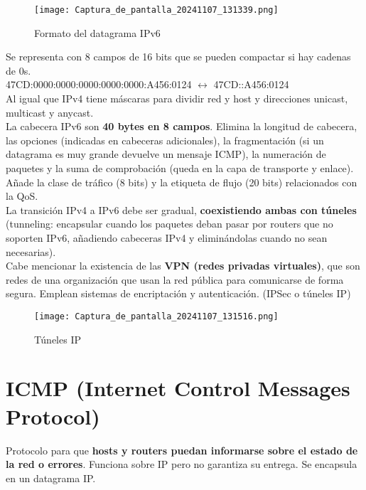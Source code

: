 \documentclass{article}
\begin{document}
\begin{figure}[h]
    \centering
    \texttt{[image: Captura\_de\_pantalla\_20241107\_131339.png]}
    \caption{Formato del datagrama IPv6}
    \label{fig:etiqueta}
\end{figure}

Se representa con 8 campos de 16 bits que se pueden compactar si hay cadenas de 0s. \\
47CD:0000:0000:0000:0000:0000:A456:0124 $\leftrightarrow$ 47CD::A456:0124 \\
Al igual que IPv4 tiene máscaras para dividir red y host y direcciones unicast, multicast y anycast. \\

La cabecera IPv6 son \textbf{40 bytes en 8 campos}. Elimina la longitud de cabecera, las opciones (indicadas en cabeceras adicionales), la fragmentación (si un datagrama es muy grande devuelve un mensaje ICMP), la numeración de paquetes y la suma de comprobación (queda en la capa de transporte y enlace). \\

Añade la clase de tráfico (8 bits) y la etiqueta de flujo (20 bits) relacionados con la QoS. \\
La transición IPv4 a IPv6 debe ser gradual, \textbf{coexistiendo ambas con túneles} (tunneling: encapsular cuando los paquetes deban pasar por routers que no soporten IPv6, añadiendo cabeceras IPv4 y eliminándolas cuando no sean necesarias). \\

Cabe mencionar la existencia de las \textbf{VPN (redes privadas virtuales)}, que son redes de una organización que usan la red pública para comunicarse de forma segura. Emplean sistemas de encriptación y autenticación. (IPSec o túneles IP) \\

\begin{figure}[h]
    \centering
    \texttt{[image: Captura\_de\_pantalla\_20241107\_131516.png]}
    \caption{Túneles IP}
    \label{fig:etiqueta}
\end{figure}

\section{ICMP (Internet Control Messages Protocol)}
Protocolo para que \textbf{hosts y routers puedan informarse sobre el estado de la red o errores}. Funciona sobre IP pero no garantiza su entrega. Se encapsula en un datagrama IP. \\
\end{document}
